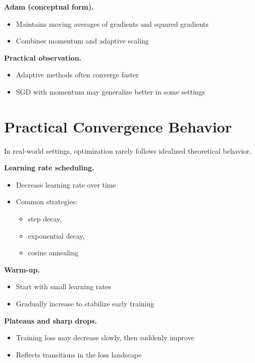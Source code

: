 \medskip

\noindent
\textbf{Adam (conceptual form).}
\begin{itemize}
    \item Maintains moving averages of gradients and squared gradients
    \item Combines momentum and adaptive scaling
\end{itemize}

\medskip

\noindent
\textbf{Practical observation.}
\begin{itemize}
    \item Adaptive methods often converge faster
    \item SGD with momentum may generalize better in some settings
\end{itemize}

\section{Practical Convergence Behavior}

In real-world settings, optimization rarely follows idealized theoretical behavior.

\medskip

\noindent
\textbf{Learning rate scheduling.}
\begin{itemize}
    \item Decrease learning rate over time
    \item Common strategies:
    \begin{itemize}
        \item step decay,
        \item exponential decay,
        \item cosine annealing
    \end{itemize}
\end{itemize}

\medskip

\noindent
\textbf{Warm-up.}
\begin{itemize}
    \item Start with small learning rates
    \item Gradually increase to stabilize early training
\end{itemize}

\medskip

\noindent
\textbf{Plateaus and sharp drops.}
\begin{itemize}
    \item Training loss may decrease slowly, then suddenly improve
    \item Reflects transitions in the loss landscape
\end{itemize}

